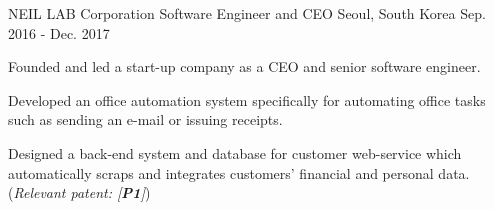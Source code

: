 


\begin{cventries}

\cventry
{NEIL LAB Corporation} %
{Software Engineer and CEO} %
{Seoul, South Korea} %
{Sep. 2016 - Dec. 2017} %
{ %
\begin{cvitems}
\item {Founded and led a start-up company as a CEO and senior software engineer.}
\item {Developed an office automation system specifically for automating office tasks such as sending an e-mail or issuing receipts.}
\item {Designed a back-end system and database for customer web-service which automatically scraps and integrates customers' financial and personal data. (\textit{Relevant patent: [\textbf{P1}]})}
\end{cvitems}
}



\end{cventries}
